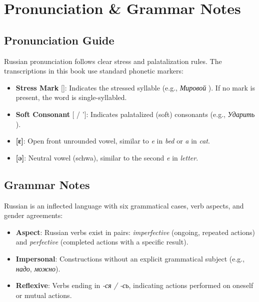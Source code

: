\chapter*{Pronunciation \& Grammar Notes}

\section*{Pronunciation Guide}

Russian pronunciation follows clear stress and palatalization rules. The transcriptions in this book use standard phonetic markers:

\begin{itemize}[leftmargin=1.5em, itemsep=0.4em]
  \item \textbf{Stress Mark} [\textquotesingle]: Indicates the stressed syllable (e.g., \textit{Мировой} {}). If no mark is present, the word is single-syllabled.
  \item \textbf{Soft Consonant} [\textquotesingle{} / ’]: Indicates palatalized (soft) consonants (e.g., \textit{Ударить} {\ipafont [u'darit’]}).
  \item \textbf{[{\ipafont ɛ}]}: Open front unrounded vowel, similar to \textit{e} in \textit{bed} or \textit{a} in \textit{cat}.
  \item \textbf{[{\ipafont ə}]}: Neutral vowel (schwa), similar to the second \textit{e} in \textit{letter}.
\end{itemize}

\section*{Grammar Notes}

Russian is an inflected language with six grammatical cases, verb aspects, and gender agreements:
\begin{itemize}[leftmargin=1.5em, itemsep=0.4em]
  \item \textbf{Aspect}: Russian verbs exist in pairs: \textit{imperfective} (ongoing, repeated actions) and \textit{perfective} (completed actions with a specific result).
  \item \textbf{Impersonal}: Constructions without an explicit grammatical subject (e.g., \textit{надо}, \textit{можно}).
  \item \textbf{Reflexive}: Verbs ending in \textit{-ся / -сь}, indicating actions performed on oneself or mutual actions.
\end{itemize}
